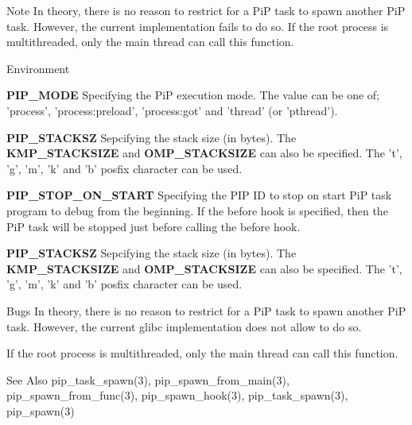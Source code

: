 \begin{DoxyNote}{Note}
In theory, there is no reason to restrict for a Pi\-P task to spawn another Pi\-P task. However, the current implementation fails to do so. If the root process is multithreaded, only the main thread can call this function.
\end{DoxyNote}
\begin{DoxyParagraph}{Environment}
\begin{DoxyItemize}
\item {\bfseries P\-I\-P\-\_\-\-M\-O\-D\-E} Specifying the Pi\-P execution mode. The value can be one of; 'process', 'process\-:preload', 'process\-:got' and 'thread' (or 'pthread'). \item {\bfseries P\-I\-P\-\_\-\-S\-T\-A\-C\-K\-S\-Z} Sepcifying the stack size (in bytes). The {\bfseries K\-M\-P\-\_\-\-S\-T\-A\-C\-K\-S\-I\-Z\-E} and {\bfseries O\-M\-P\-\_\-\-S\-T\-A\-C\-K\-S\-I\-Z\-E} can also be specified. The 't', 'g', 'm', 'k' and 'b' posfix character can be used. \item {\bfseries P\-I\-P\-\_\-\-S\-T\-O\-P\-\_\-\-O\-N\-\_\-\-S\-T\-A\-R\-T} Specifying the P\-I\-P I\-D to stop on start Pi\-P task program to debug from the beginning. If the before hook is specified, then the Pi\-P task will be stopped just before calling the before hook. \item {\bfseries P\-I\-P\-\_\-\-S\-T\-A\-C\-K\-S\-Z} Sepcifying the stack size (in bytes). The {\bfseries K\-M\-P\-\_\-\-S\-T\-A\-C\-K\-S\-I\-Z\-E} and {\bfseries O\-M\-P\-\_\-\-S\-T\-A\-C\-K\-S\-I\-Z\-E} can also be specified. The 't', 'g', 'm', 'k' and 'b' posfix character can be used.\end{DoxyItemize}

\end{DoxyParagraph}
\begin{DoxyParagraph}{Bugs}
In theory, there is no reason to restrict for a Pi\-P task to spawn another Pi\-P task. However, the current glibc implementation does not allow to do so. 
\end{DoxyParagraph}
\begin{DoxyParagraph}{}
If the root process is multithreaded, only the main thread can call this function.
\end{DoxyParagraph}
\begin{DoxySeeAlso}{See Also}
pip\-\_\-task\-\_\-spawn(3), pip\-\_\-spawn\-\_\-from\-\_\-main(3), pip\-\_\-spawn\-\_\-from\-\_\-func(3), pip\-\_\-spawn\-\_\-hook(3), pip\-\_\-task\-\_\-spawn(3), pip\-\_\-spawn(3) 
\end{DoxySeeAlso}
